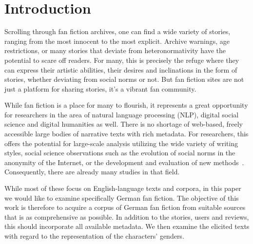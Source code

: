 \chapter{Introduction}\label{ch:intro}


Scrolling through fan fiction archives, one can find a wide variety of stories, ranging from the most innocent to the most explicit.
Archive warnings, age restrictions, or many stories that deviate from heteronormativity have the potential to scare off readers.
For many, this is precisely the refuge where they can express their artistic abilities, their desires and inclinations in the form of stories, whether deviating from social norms or not.
But fan fiction sites are not just a platform for sharing stories, it's a vibrant fan community.

While fan fiction is a place for many to flourish, it represents a great opportunity for researchers in the area of natural language processing (NLP), digital social science and digital humanities as well.
There is no shortage of web-based, freely accessible large bodies of narrative texts with rich metadata.
For researchers, this offers the potential for large-scale analysis utilizing the wide variety of writing styles, social science observations such as the evolution of social norms in the anonymity of the Internet, or the development and evaluation of new methods~\citep{Yoder2021FanfictionNLP:Fanfiction, Liu2019DENS:Analysis, Muttenthaler2019AuthorshipN-grams, Vilares2019HarryLanguage, Zhang2019GeneratingFiction}.
Consequently, there are already many studies in that field.

While most of these focus on English-language texts and corpora, in this paper we would like to examine specifically German fan fiction.
The objective of this work is therefore to acquire a corpus of German fan fiction from suitable sources that is as comprehensive as possible.
In addition to the stories, users and reviews, this should incorporate all available metadata.
We then examine the elicited texts with regard to the representation of the characters' genders.

